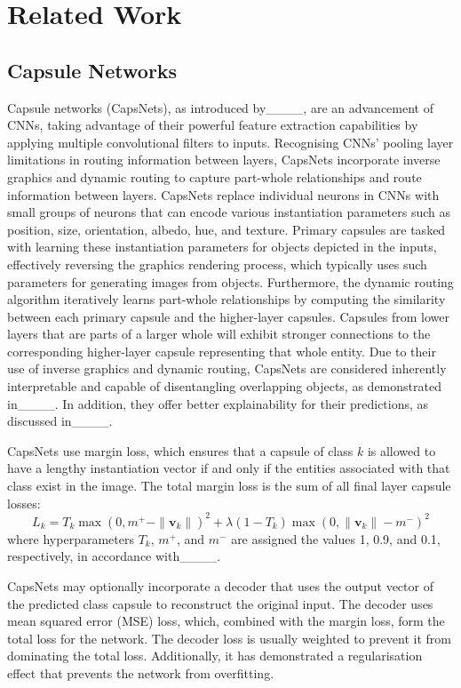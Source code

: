 \section{Related Work}
\label{sec2}

\subsection{Capsule Networks}
Capsule networks (CapsNets), as introduced by____, are an advancement of CNNs, taking advantage of their powerful feature extraction capabilities by applying multiple convolutional filters to inputs. Recognising CNNs' pooling layer limitations in routing information between layers, CapsNets incorporate inverse graphics and dynamic routing to capture part-whole relationships and route information between layers. CapsNets replace individual neurons in CNNs with small groups of neurons that can encode various instantiation parameters such as position, size, orientation, albedo, hue, and texture. Primary capsules are tasked with learning these instantiation parameters for objects depicted in the inputs, effectively reversing the graphics rendering process, which typically uses such parameters for generating images from objects. Furthermore, the dynamic routing algorithm iteratively learns part-whole relationships by computing the similarity between each primary capsule and the higher-layer capsules. Capsules from lower layers that are parts of a larger whole will exhibit stronger connections to the corresponding higher-layer capsule representing that whole entity. Due to their use of inverse graphics and dynamic routing, CapsNets are considered inherently interpretable and capable of disentangling overlapping objects, as demonstrated in____. In addition, they offer better explainability for their predictions, as discussed in____.

CapsNets use margin loss, which ensures that a capsule of class $k$ is allowed to have a lengthy instantiation vector if and only if the entities associated with that class exist in the image. The total margin loss is the sum of all final layer capsule losses:
\begin{equation}
L_k = T_k \max(0, m^{+} - \|\mathbf{v}_k\|)^2 + \lambda (1 - T_k) \max(0, \|\mathbf{v}_k\| - m^{-})^2
\label{eq_margin_loss}
\end{equation}
where hyperparameters $T_k$, $m^+$, and $m^-$ are assigned the values 1, 0.9, and 0.1, respectively, in accordance with____.

CapsNets may optionally incorporate a decoder that uses the output vector of the predicted class capsule to reconstruct the original input. The decoder uses mean squared error (MSE) loss, which, combined with the margin loss, form the total loss for the network. The decoder loss is usually weighted to prevent it from dominating the total loss. Additionally, it has demonstrated a regularisation effect that prevents the network from overfitting.


